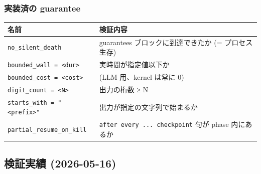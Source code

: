 \documentclass[
]{ltjsarticle}
\newcounter{none} %
\begin{document}
\subsubsection{実装済の
guarantee}\label{ux5b9fux88c5ux6e08ux306e-guarantee}

{\def\LTcaptype{none} %
\begin{longtable}[]{@{}
  >{\raggedright\arraybackslash}p{}
  >{\raggedright\arraybackslash}p{}@{}}
\toprule\noalign{}
\begin{minipage}[b]{\linewidth}\raggedright
名前
\end{minipage} & \begin{minipage}[b]{\linewidth}\raggedright
検証内容
\end{minipage} \\
\midrule\noalign{}
\endhead
\bottomrule\noalign{}
\endlastfoot
\texttt{no\_silent\_death} & guarantees ブロックに到達できたか (=
プロセス生存) \\
\texttt{bounded\_wall\ =\ \textless{}dur\textgreater{}} &
実時間が指定値以下か \\
\texttt{bounded\_cost\ =\ \textless{}cost\textgreater{}} & (LLM
用、kernel は常に 0) \\
\texttt{digit\_count\ =\ \textless{}N\textgreater{}} & 出力の桁数 ≥ N \\
\texttt{starts\_with\ =\ "\textless{}prefix\textgreater{}"} &
出力が指定の文字列で始まるか \\
\texttt{partial\_resume\_on\_kill} &
\texttt{after\ every\ ...\ checkpoint} 句が phase 内にあるか \\
\end{longtable}
}

\subsection{検証実績
(2026-05-16)}\label{ux691cux8a3cux5b9fux7e3e-2026-05-16}
\end{document}
